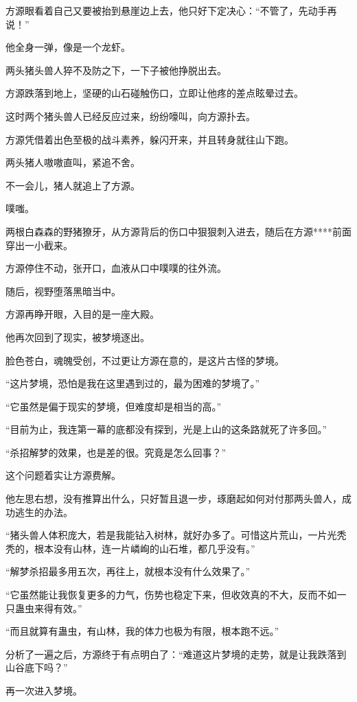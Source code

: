 \begin{this_body}
方源眼看着自己又要被抬到悬崖边上去，他只好下定决心：“不管了，先动手再说！”

他全身一弹，像是一个龙虾。

两头猪头兽人猝不及防之下，一下子被他挣脱出去。

方源跌落到地上，坚硬的山石碰触伤口，立即让他疼的差点眩晕过去。

这时两个猪头兽人已经反应过来，纷纷嚎叫，向方源扑去。

方源凭借着出色至极的战斗素养，躲闪开来，并且转身就往山下跑。

两头猪人嗷嗷直叫，紧追不舍。

不一会儿，猪人就追上了方源。

噗嗤。

两根白森森的野猪獠牙，从方源背后的伤口中狠狠刺入进去，随后在方源****前面穿出一小截来。

方源停住不动，张开口，血液从口中噗噗的往外流。

随后，视野堕落黑暗当中。

方源再睁开眼，入目的是一座大殿。

他再次回到了现实，被梦境逐出。

脸色苍白，魂魄受创，不过更让方源在意的，是这片古怪的梦境。

“这片梦境，恐怕是我在这里遇到过的，最为困难的梦境了。”

“它虽然是偏于现实的梦境，但难度却是相当的高。”

“目前为止，我连第一幕的底都没有探到，光是上山的这条路就死了许多回。”

“杀招解梦的效果，也是差的很。究竟是怎么回事？”

这个问题着实让方源费解。

他左思右想，没有推算出什么，只好暂且退一步，琢磨起如何对付那两头兽人，成功逃生的办法。

“猪头兽人体积庞大，若是我能钻入树林，就好办多了。可惜这片荒山，一片光秃秃的，根本没有山林，连一片嶙峋的山石堆，都几乎没有。”

“解梦杀招最多用五次，再往上，就根本没有什么效果了。”

“它虽然能让我恢复更多的力气，伤势也稳定下来，但收效真的不大，反而不如一只蛊虫来得有效。”

“而且就算有蛊虫，有山林，我的体力也极为有限，根本跑不远。”

分析了一遍之后，方源终于有点明白了：“难道这片梦境的走势，就是让我跌落到山谷底下吗？”

再一次进入梦境。


\end{this_body}
